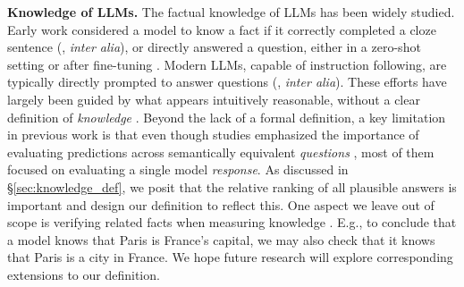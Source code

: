 \textbf{Knowledge of LLMs.}
The factual knowledge of LLMs has been widely studied. Early work considered a model to know a fact if it correctly completed a cloze sentence (\citealp{LLMs_as_KG_1,LLMs_as_KG_5, kassner-etal-2020-pretrained}, \textit{inter alia}), or directly answered a question, either in a zero-shot setting \citep{radford2019language} or after fine-tuning \citep{roberts2020much}.
Modern LLMs, capable of instruction following, 
are typically directly prompted to answer questions 
(\citealp{SimpleQA, singhal2023large, anil2023palm, dubey2024llama, LLMs_as_KG_3}, \textit{inter alia}). These efforts have largely been guided by what appears intuitively reasonable,
without a clear definition of \emph{knowledge} \citep{fierro2024defining}. Beyond the lack of a formal definition, a key limitation in previous work is that even though studies emphasized the importance of evaluating predictions across semantically equivalent \textit{questions} \citep{elazar2021tacl,de-cao-etal-2021-editing,zheng2023emnlp}, most of them focused on evaluating a single model \textit{response}.
As discussed in \S \ref{sec:knowledge_def}, we posit that the relative ranking of all plausible answers is important and design our definition to reflect this.
One aspect we leave out of scope is verifying related facts when measuring knowledge \citep{kassner-etal-2021-beliefbank,zhong2023emnlp,DBLP:journals/tacl/CohenBYGG24}. E.g., to conclude that a model knows that Paris is France's capital, we may also check that it knows that Paris is a city in France. We hope future research will explore corresponding extensions to our definition.


